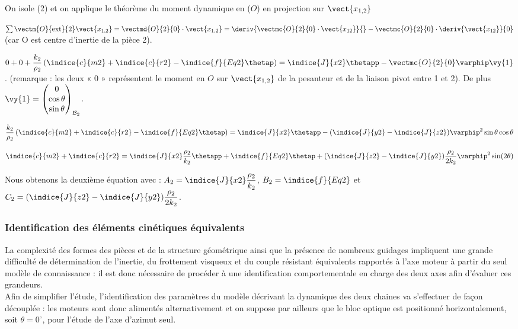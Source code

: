 \begin{corrige}
\vspace{1cm}

On isole (2) et on applique le théorème du moment dynamique en ($O$) en projection sur $\vect{x_{1,2}}$

$\sum \vectm{O}{\text{ext}}{2} \vect{x_{1,2}}  = \vectmd{O}{2}{0} \cdot \vect{x_{1,2}} = \deriv{\vectmc{O}{2}{0}\cdot \vect{x_{12}}}{} - \vectmc{O}{2}{0}\cdot\deriv{\vect{x_{12}}}{0}$ (car O est centre d’inertie de la pièce 2).

$0+0+\dfrac{k_2}{\rho_2}\left(\indice{c}{m2}+\indice{c}{r2}-\indice{f}{Eq2}\thetap\right)=\indice{J}{x2}  \thetapp - 
\vectmc{O}{2}{0} \varphip \vy{1}$. (remarque : les deux « 0 » représentent le moment en $O$ sur $\vect{x_{1,2}}$ de la pesanteur et de la liaison pivot entre 1 et 2). De plus $\vy{1}=\begin{pmatrix} 0 \\ \cos\theta \\ \sin \theta \end{pmatrix}_{\mathcal{B}_2}$.



$\dfrac{k_2}{\rho_2}\left(\indice{c}{m2}+\indice{c}{r2}-\indice{f}{Eq2}\thetap \right)=\indice{J}{x2} \thetapp-(\indice{J}{y2}-\indice{J}{z2} )   \varphip^2   \sin  \theta  \cos  \theta$

$\indice{c}{m2}+\indice{c}{r2}=\indice{J}{x2}\dfrac{\rho_2}{k_2} \thetapp+\indice{f}{Eq2}\thetap+(\indice{J}{z2}-\indice{J}{y2 })\dfrac{ \rho_2}{2  k_2}\varphip^2   \sin ( 2  \theta)$

Nous obtenons la deuxième équation avec : 
$A_2=\indice{J}{x2}  \dfrac{\rho_2}{k_2}$, $B_2=\indice{f}{Eq2}$ et $C_2=(\indice{J}{z2}-\indice{J}{y2})\dfrac{\rho_2}{2 k_2}$.

\end{corrige}
\else
\fi








\subsubsection{Identification des éléments cinétiques équivalents}
La complexité des formes des pièces et de la structure géométrique ainsi que la présence de nombreux guidages impliquent une grande difficulté de détermination de l'inertie, du frottement visqueux et du couple résistant équivalents rapportés à l'axe moteur à partir du seul modèle de connaissance : il est donc nécessaire de procéder à une identification comportementale en charge des deux axes afin d'évaluer ces grandeurs.\\
Afin de simplifier l'étude, l'identification des paramètres du modèle décrivant la dynamique des deux chaines va s'effectuer de façon découplée : les moteurs sont donc alimentés alternativement et on suppose par ailleurs que le bloc optique est positionné horizontalement, soit $\theta=0^{\circ}$, pour l'étude de l'axe d'azimut seul.\\

